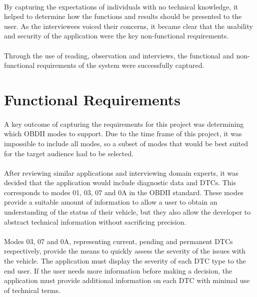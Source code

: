 	\paragraph{}{
	By capturing the expectations of individuals with no technical knowledge, it helped to determine how the functions and results should be presented to the user. As the interviewees voiced their concerns, it became clear that the usability and security of the application were the key non-functional requirements.
	}
	
	\paragraph{}{
	Through the use of reading, observation and interviews, the functional and non-functional requirements of the system were successfully captured.
	}
	
\section{Functional Requirements}	
	\paragraph{}{
	A key outcome of capturing the requirements for this project was determining which OBDII modes to support. Due to the time frame of this project, it was impossible to include all modes, so a subset of modes that would be best suited for the target audience had to be selected.
	}
	\paragraph{}{
	After reviewing similar applications and interviewing domain experts, it was decided that the application would include diagnostic data and DTCs. This corresponds to modes 01, 03, 07 and 0A in the OBDII standard. These modes provide a suitable amount of information to allow a user to obtain an understanding of the status of their vehicle, but they also allow the developer to abstract technical information without sacrificing precision.
	}
	\paragraph{}{
	Modes 03, 07 and 0A, representing current, pending and permanent DTCs respectively, provide the means to quickly assess the severity of the issues with the vehicle. The application must display the severity of each DTC type to the end user. If the user needs more information before making a decision, the application must provide additional information on each DTC with minimal use of technical terms.
	}
